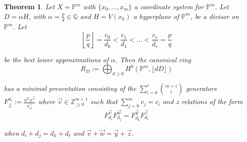 \documentclass{amsart}
\theoremstyle{plain}
\newtheorem{thm}{Theorem}[section]
\theoremstyle{definition}
\theoremstyle{remark}
\numberwithin{equation}{section}
\newcommand\bq{{\mathbb Q}}
\newcommand\bp{{\mathbb P}}
\newcommand\bz{{\mathbb Z}}
\begin{document}
\begin{thm}
\label{thm:proj-one-point}
Let $X = \bp^m$ with $\{x_0, \ldots, x_m\}$ a coordinate system for
$\bp^m$. Let $D = \alpha H$, with $\alpha = \frac{p}{q} \in \bq$
and $H = V(x_k)$ a hyperplane of $\bp^m$, be a divisor on $\bp^m$.
Let
\[
	\left\lfloor \frac{p}{q} \right\rfloor = \frac{c_0}{d_0} <
	\frac{c_1}{d_1} < \ldots < \frac{c_r}{d_r} = \frac{p}{q}
\]

\noindent
be the best lower approximations of $\alpha$. Then the
canonical ring
\[
	R_D := \bigoplus_{d \geq 0} H^0(\bp^m, \lfloor dD \rfloor)
\]

\noindent
has a minimal presentation consisting of the $\sum_{i = 0}^{r}
{{m + i} \choose {i}}$ generators $F_{\vec{v}}^{d_i} := \frac{u^{d_i}
x^{\vec{v}}}{x_k^{c_i}}$ where $\vec{v} \in \bz_{\geq 0}^{m + 1}$
such that $\sum_{j = 0}^{m} v_j = c_i$ and $z$ 
relations of the form
\[
	F_{d_i}^{\vec{v}} F_{d_j}^{\vec{w}} = F_{d_k}^{\vec{y}} F_{d_\ell}^{\vec{z}}
\]

\noindent
when $d_i + d_j = d_k + d_\ell$ and $\vec{v} + \vec{w} = \vec{y} +
\vec{z}$.
\end{thm}
\end{document}
